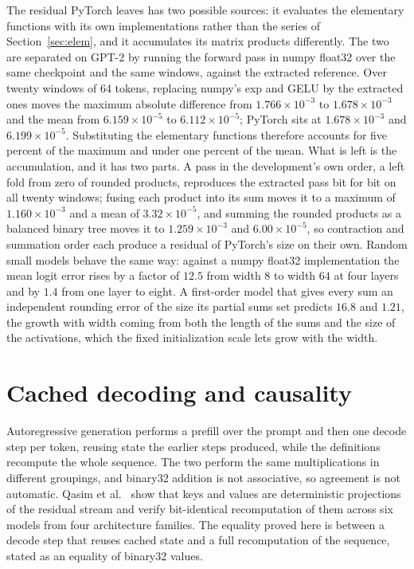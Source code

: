 \documentclass[11pt]{article}
\theoremstyle{plain}
\theoremstyle{definition}
\begin{document}
The residual PyTorch leaves has two possible sources: it evaluates the
elementary functions with its own implementations rather than the series of
Section~\ref{sec:elem}, and it accumulates its matrix products differently. The
two are separated on GPT-2 by running the forward pass in numpy float32 over the
same checkpoint and the same windows, against the extracted reference. Over
twenty windows of 64 tokens, replacing numpy's exp and GELU by the extracted ones
moves the maximum absolute difference from $1.766\times10^{-3}$ to
$1.678\times10^{-3}$ and the mean from $6.159\times10^{-5}$ to
$6.112\times10^{-5}$; PyTorch sits at $1.678\times10^{-3}$ and
$6.199\times10^{-5}$. Substituting the elementary functions therefore accounts
for five percent of the maximum and under one percent of the mean. What is left
is the accumulation, and it has two parts. A pass in the development's own
order, a left fold from zero of rounded products, reproduces the extracted pass
bit for bit on all twenty windows; fusing each product into its sum moves it to
a maximum of $1.160\times10^{-3}$ and a mean of $3.32\times10^{-5}$, and summing
the rounded products as a balanced binary tree moves it to $1.259\times10^{-3}$
and $6.00\times10^{-5}$, so contraction and summation order each produce a
residual of PyTorch's size on their own. Random small models behave the same
way: against a numpy float32 implementation the mean logit error rises by a
factor of $12.5$ from width $8$ to width $64$ at four layers and by $1.4$ from
one layer to eight. A first-order model that gives every sum an independent
rounding error of the size its partial sums set \cite{highammary2019} predicts
$16.8$ and $1.21$, the growth with width coming from both the length of the
sums and the size of the activations, which the fixed initialization scale lets
grow with the width.

\section{Cached decoding and causality}
\label{sec:cache}

Autoregressive generation performs a prefill over the prompt and then one
decode step per token, reusing state the earlier steps produced, while the
definitions recompute the whole sequence. The two perform the same
multiplications in different groupings, and binary32 addition is not
associative, so agreement is not automatic. Qasim et al.\ \cite{residualstream}
show that keys and values are deterministic projections of the residual stream
and verify bit-identical recomputation of them across six models from four
architecture families. The equality proved here is between a decode step that
reuses cached state and a full recomputation of the sequence, stated as an
equality of binary32 values.
\end{document}

